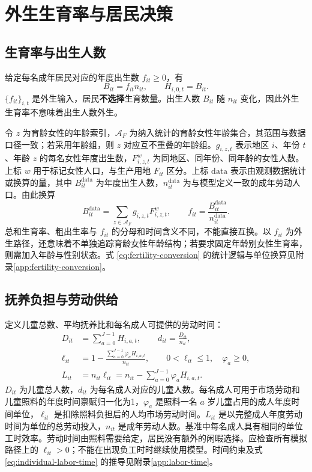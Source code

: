 \documentclass[UTF8,a4paper,zihao=-4,fontset=windows]{ctexart}
\numberwithin{equation}{section}
\begin{document}
\section{外生生育率与居民决策}
\label{sec:households}

\subsection{生育率与出生人数}
给定每名成年居民对应的年度出生数 $f_{it}\geq0$，有
\begin{equation}
  B_{it}=f_{it}n_{it},\qquad H_{i,0,t}=B_{it}.
  \label{eq:births}
\end{equation}
$\{f_{it}\}_{i,t}$ 是外生输入，居民\textbf{不选择}生育数量。出生人数 $B_{it}$ 随 $n_{it}$ 变化，因此外生生育率不意味着出生人数外生。

令 $z$ 为育龄女性的年龄索引，$\mathcal A_F$ 为纳入统计的育龄女性年龄集合，其范围与数据口径一致；若采用年龄组，则 $z$ 对应互不重叠的年龄组。$g_{i,z,t}$ 表示地区 $i$、年份 $t$、年龄 $z$ 的每名女性年度出生数，$F^w_{i,z,t}$ 为同地区、同年份、同年龄的女性人数。上标 $w$ 用于标记女性人口，与生产用地 $F_{it}$ 区分。上标 $\mathrm{data}$ 表示由观测数据统计或换算的量，其中 $B^{\mathrm{data}}_{it}$ 为年度出生人数，$n^{\mathrm{data}}_{it}$ 为与模型定义一致的成年劳动人口。由此换算
\begin{equation}
  B^{\mathrm{data}}_{it}=\sum_{z\in\mathcal A_F}g_{i,z,t}F^w_{i,z,t},
  \qquad
  f_{it}=\frac{B^{\mathrm{data}}_{it}}{n^{\mathrm{data}}_{it}}.
  \label{eq:fertility-conversion}
\end{equation}
总和生育率、粗出生率与 $f_{it}$ 的分母和时间含义不同，不能直接互换。以 $f_{it}$ 为外生路径，还意味着不单独追踪育龄女性年龄结构；若要求固定年龄别女性生育率，则需加入年龄与性别状态。式 \eqref{eq:fertility-conversion} 的统计逻辑与单位换算见附录\ref{app:fertility-conversion}。

\subsection{抚养负担与劳动供给}
定义儿童总数、平均抚养比和每名成人可提供的劳动时间：
\begin{align}
  D_{it}&=\sum_{a=0}^{J-1}H_{i,a,t},\qquad
  d_{it}=\frac{D_{it}}{n_{it}},\label{eq:dependency-ratio}\\
  \ell_{it}&=1-\frac{\sum_{a=0}^{J-1}\varphi_aH_{i,a,t}}{n_{it}},
  \qquad 0<\ell_{it}\leq1,\quad \varphi_a\geq0,
  \label{eq:individual-labor-time}\\
  L_{it}&=n_{it}\ell_{it}
  =n_{it}-\sum_{a=0}^{J-1}\varphi_aH_{i,a,t}.
  \label{eq:labor-supply}
\end{align}
$D_{it}$ 为儿童总人数，$d_{it}$ 为每名成人对应的儿童人数。每名成人可用于市场劳动和儿童照料的年度时间禀赋归一化为1，$\varphi_a$ 是照料一名 $a$ 岁儿童占用的成人年度时间单位，$\ell_{it}$ 是扣除照料负担后的人均市场劳动时间。$L_{it}$ 是以完整成人年度劳动时间为单位的总劳动投入，$n_{it}$ 是成年劳动人数。基准中每名成人具有相同的单位工时效率。劳动时间由照料需要给定，居民没有额外的闲暇选择。应检查所有模拟路径上的 $\ell_{it}>0$；不能在出现负工时时继续使用模型。时间约束及式 \eqref{eq:individual-labor-time} 的推导见附录\ref{app:labor-time}。
\end{document}
